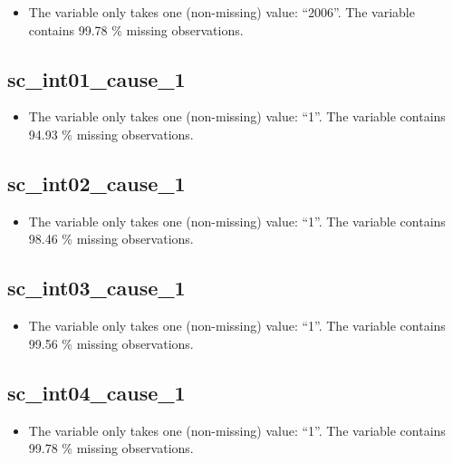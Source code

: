 \documentclass[
  letterpaper,
  DIV=11,
  numbers=noendperiod]{scrartcl}
\providecommand{\tightlist}{%
  \setlength{\itemsep}{0pt}\setlength{\parskip}{0pt}}
\begin{document}
\begin{itemize}
\tightlist
\item
  The variable only takes one (non-missing) value: ``2006''. The
  variable contains 99.78 \% missing observations.
\end{itemize}

\fullline

\subsection{sc\_int01\_cause\_1}\label{sc_int01_cause_1}

\begin{itemize}
\tightlist
\item
  The variable only takes one (non-missing) value: ``1''. The variable
  contains 94.93 \% missing observations.
\end{itemize}

\fullline

\subsection{sc\_int02\_cause\_1}\label{sc_int02_cause_1}

\begin{itemize}
\tightlist
\item
  The variable only takes one (non-missing) value: ``1''. The variable
  contains 98.46 \% missing observations.
\end{itemize}

\fullline

\subsection{sc\_int03\_cause\_1}\label{sc_int03_cause_1}

\begin{itemize}
\tightlist
\item
  The variable only takes one (non-missing) value: ``1''. The variable
  contains 99.56 \% missing observations.
\end{itemize}

\fullline

\subsection{sc\_int04\_cause\_1}\label{sc_int04_cause_1}

\begin{itemize}
\tightlist
\item
  The variable only takes one (non-missing) value: ``1''. The variable
  contains 99.78 \% missing observations.
\end{itemize}
\end{document}
